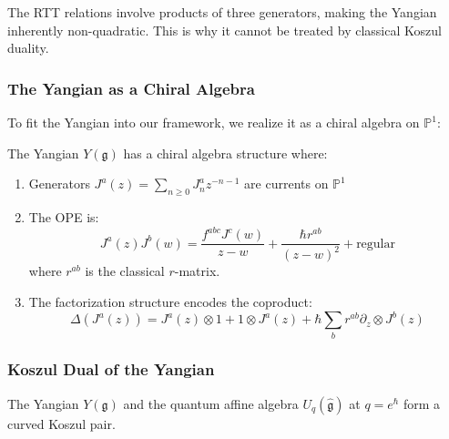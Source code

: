 \begin{remark}
The RTT relations involve products of three generators, making the Yangian inherently non-quadratic. This is why it cannot be treated by classical Koszul duality.
\end{remark}

\subsubsection{The Yangian as a Chiral Algebra}

To fit the Yangian into our framework, we realize it as a chiral algebra on $\mathbb{P}^1$:

\begin{theorem}
The Yangian $Y(\mathfrak{g})$ has a chiral algebra structure where:
\begin{enumerate}
\item Generators $J^a(z) = \sum_{n \geq 0} J_n^a z^{-n-1}$ are currents on $\mathbb{P}^1$

\item The OPE is:
$$J^a(z)J^b(w) = \frac{f^{abc}J^c(w)}{z-w} + \frac{\hbar r^{ab}}{(z-w)^2} + \text{regular}$$
where $r^{ab}$ is the classical $r$-matrix.

\item The factorization structure encodes the coproduct:
$$\Delta(J^a(z)) = J^a(z) \otimes 1 + 1 \otimes J^a(z) + \hbar\sum_b r^{ab} \partial_z \otimes J^b(z)$$
\end{enumerate}
\end{theorem}

\subsubsection{Koszul Dual of the Yangian}

\begin{theorem}
The Yangian $Y(\mathfrak{g})$ and the quantum affine algebra $U_q(\hat{\mathfrak{g}})$ at $q = e^{\hbar}$ form a curved Koszul pair.
\end{theorem}

